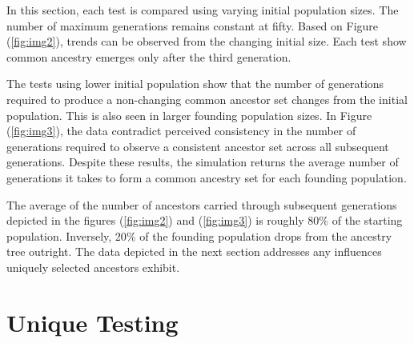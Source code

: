 \documentclass[12pt]{extarticle}
\begin{document}
In this section, each test is compared using varying initial population sizes. The number of maximum generations remains constant at fifty. Based on Figure (\ref{fig:img2}), trends can be observed from the changing initial size. Each test show common ancestry emerges only after the third generation.

The tests using lower initial population show that the number of generations required to produce a non-changing common ancestor set changes from the initial population. This is also seen in larger founding population sizes. In Figure (\ref{fig:img3}), the data contradict perceived consistency in the number of generations required to observe a consistent ancestor set across all subsequent generations. Despite these results, the simulation returns the average number of generations it takes to form a common ancestry set for each founding population. 

The average of the number of ancestors carried through subsequent generations depicted in the figures (\ref{fig:img2}) and (\ref{fig:img3}) is roughly 80$\%$ of the starting population. Inversely, 20$\%$ of the founding population drops from the ancestry tree outright.  The data depicted in the next section addresses any influences uniquely selected ancestors exhibit.

\section{Unique Testing}
\end{document}

